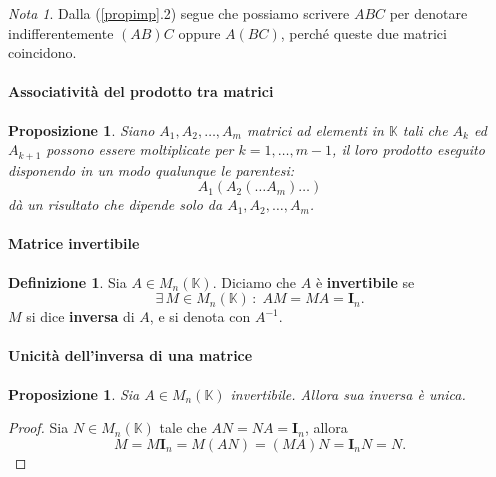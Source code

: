 \documentclass{article}
\theoremstyle{plain}
\newtheorem{prop}[thm]{Proposizione}
\theoremstyle{definition}
\newtheorem{defn}{Definizione}[section]
\theoremstyle{remark}
\newtheorem{note}{Nota}
\begin{document}
\vspace{10pt}

\begin{note}
    Dalla (\ref{propimp}.2) segue che possiamo scrivere \( ABC \) per denotare indifferentemente \( (AB)C \) oppure \( A(BC) \), perché queste due matrici coincidono. 
\end{note}

\vspace{10pt}

\paragraph{Associatività del prodotto tra matrici}
\begin{bxthm}
\begin{prop}\label{prop:cinque}
    Siano \( A_1, A_2, \ldots, A_m \) matrici ad elementi in \( \mathbb{K} \) tali che \( A_k \) ed \( A_{k+1} \) possono essere moltiplicate per \( k = 1, \ldots, m - 1 \), il loro prodotto eseguito disponendo in un modo qualunque le parentesi:
    \[A_1(A_2(\ldots A_m) \ldots )\]
    dà un risultato che dipende solo da \( A_1, A_2, \ldots, A_m \). 
\end{prop}
\end{bxthm}

\vspace{10pt}

\paragraph{Matrice invertibile}
\begin{bxthm}
\begin{defn}
    Sia \( A\in M_n(\mathbb{K}) \). Diciamo che $A$ è \textbf{invertibile} se
    \[\exists\,M \in M_n(\mathbb{K})\,:\; AM = MA = \mathbf{I}_n . \]
    \( M \) si dice \textbf{inversa} di \( A \), e si denota con \( A^{-1} \).
\end{defn}
\end{bxthm}

\vspace{10pt}

\paragraph{Unicità dell'inversa di una matrice}
\begin{bxthm}
\begin{prop}
    Sia $A\in M_n(\mathbb{K})$ invertibile. Allora sua inversa è unica.
\end{prop}
\end{bxthm}
\begin{proof}
    Sia \( N\in M_n(\mathbb{K}) \) tale che \( AN = NA = \mathbf{I}_n \), allora
    \[
        M = M \mathbf{I}_n = M(AN) = (MA)N = \mathbf{I}_n N = N.
    \]
\end{proof}
\end{document}
